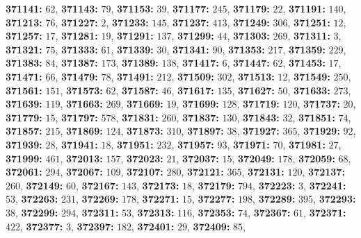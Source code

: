 \textsf{\bfseries 371141:} $62$, \textsf{\bfseries 371143:} $79$, \textsf{\bfseries 371153:} $39$, \textsf{\bfseries 371177:} $245$, \textsf{\bfseries 371179:} $22$, \textsf{\bfseries 371191:} $140$, \textsf{\bfseries 371213:} $76$, \textsf{\bfseries 371227:} $2$, \textsf{\bfseries 371233:} $145$, \textsf{\bfseries 371237:} $413$, \textsf{\bfseries 371249:} $306$, \textsf{\bfseries 371251:} $12$, \textsf{\bfseries 371257:} $17$, \textsf{\bfseries 371281:} $19$, \textsf{\bfseries 371291:} $137$, \textsf{\bfseries 371299:} $44$, \textsf{\bfseries 371303:} $269$, \textsf{\bfseries 371311:} $3$, \textsf{\bfseries 371321:} $75$, \textsf{\bfseries 371333:} $61$, \textsf{\bfseries 371339:} $30$, \textsf{\bfseries 371341:} $90$, \textsf{\bfseries 371353:} $217$, \textsf{\bfseries 371359:} $229$, \textsf{\bfseries 371383:} $84$, \textsf{\bfseries 371387:} $173$, \textsf{\bfseries 371389:} $138$, \textsf{\bfseries 371417:} $6$, \textsf{\bfseries 371447:} $62$, \textsf{\bfseries 371453:} $17$, \textsf{\bfseries 371471:} $66$, \textsf{\bfseries 371479:} $78$, \textsf{\bfseries 371491:} $212$, \textsf{\bfseries 371509:} $302$, \textsf{\bfseries 371513:} $12$, \textsf{\bfseries 371549:} $250$, \textsf{\bfseries 371561:} $151$, \textsf{\bfseries 371573:} $62$, \textsf{\bfseries 371587:} $46$, \textsf{\bfseries 371617:} $135$, \textsf{\bfseries 371627:} $50$, \textsf{\bfseries 371633:} $273$, \textsf{\bfseries 371639:} $119$, \textsf{\bfseries 371663:} $269$, \textsf{\bfseries 371669:} $19$, \textsf{\bfseries 371699:} $128$, \textsf{\bfseries 371719:} $120$, \textsf{\bfseries 371737:} $20$, \textsf{\bfseries 371779:} $15$, \textsf{\bfseries 371797:} $578$, \textsf{\bfseries 371831:} $260$, \textsf{\bfseries 371837:} $130$, \textsf{\bfseries 371843:} $32$, \textsf{\bfseries 371851:} $74$, \textsf{\bfseries 371857:} $215$, \textsf{\bfseries 371869:} $124$, \textsf{\bfseries 371873:} $310$, \textsf{\bfseries 371897:} $38$, \textsf{\bfseries 371927:} $365$, \textsf{\bfseries 371929:} $92$, \textsf{\bfseries 371939:} $28$, \textsf{\bfseries 371941:} $18$, \textsf{\bfseries 371951:} $232$, \textsf{\bfseries 371957:} $93$, \textsf{\bfseries 371971:} $70$, \textsf{\bfseries 371981:} $27$, \textsf{\bfseries 371999:} $461$, \textsf{\bfseries 372013:} $157$, \textsf{\bfseries 372023:} $21$, \textsf{\bfseries 372037:} $15$, \textsf{\bfseries 372049:} $178$, \textsf{\bfseries 372059:} $68$, \textsf{\bfseries 372061:} $294$, \textsf{\bfseries 372067:} $109$, \textsf{\bfseries 372107:} $280$, \textsf{\bfseries 372121:} $365$, \textsf{\bfseries 372131:} $120$, \textsf{\bfseries 372137:} $260$, \textsf{\bfseries 372149:} $60$, \textsf{\bfseries 372167:} $143$, \textsf{\bfseries 372173:} $18$, \textsf{\bfseries 372179:} $794$, \textsf{\bfseries 372223:} $3$, \textsf{\bfseries 372241:} $53$, \textsf{\bfseries 372263:} $231$, \textsf{\bfseries 372269:} $178$, \textsf{\bfseries 372271:} $15$, \textsf{\bfseries 372277:} $198$, \textsf{\bfseries 372289:} $395$, \textsf{\bfseries 372293:} $38$, \textsf{\bfseries 372299:} $294$, \textsf{\bfseries 372311:} $53$, \textsf{\bfseries 372313:} $116$, \textsf{\bfseries 372353:} $74$, \textsf{\bfseries 372367:} $61$, \textsf{\bfseries 372371:} $422$, \textsf{\bfseries 372377:} $3$, \textsf{\bfseries 372397:} $182$, \textsf{\bfseries 372401:} $29$, \textsf{\bfseries 372409:} $85$, 
